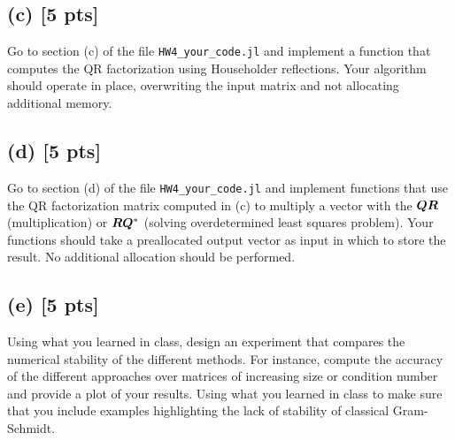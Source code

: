 \documentclass[twoside,10pt]{article}
\begin{document}
\subsection*{(c) [5 pts]}
Go to section (c) of the file \texttt{HW4\_your\_code.jl} and implement a function that computes the QR factorization using Householder reflections. 
Your algorithm should operate in place, overwriting the input matrix and not allocating additional memory. 


\subsection*{(d) [5 pts]}
Go to section (d) of the file \texttt{HW4\_your\_code.jl} and implement functions that use the QR factorization matrix computed in (c) to multiply a vector with the $\bm{Q} \bm{R}$ (multiplication) or $\bm{R}\bm{Q}^*$ (solving overdetermined least squares problem). 
Your functions should take a preallocated output vector as input in which to store the result. 
No additional allocation should be performed. 


\subsection*{(e) [5 pts]}
Using what you learned in class, design an experiment that compares the numerical stability of the different methods. 
For instance, compute the accuracy of the different approaches over matrices of increasing size or condition number and provide a plot of your results.
Using what you learned in class to make sure that you include examples highlighting the lack of stability of classical Gram-Schmidt.
\end{document}
